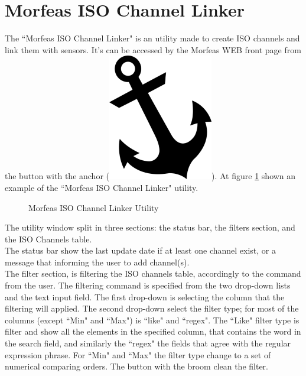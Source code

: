 \newpage
\section{Morfeas ISO Channel Linker}
The ``Morfeas ISO Channel Linker" is an utility made to create ISO channels and link them with sensors.
It's can be accessed by the Morfeas WEB front page from the button with the anchor (\includegraphics[height=.125in]{../art/anchor.png}).
At figure \ref{fig:ISOChannel_linker} shown an example of the ``Morfeas ISO Channel Linker" utility.

\begin{figure}[h]
\centering
	\caption{Morfeas ISO Channel Linker Utility}
	\label{fig:ISOChannel_linker}
\end{figure}
\noindent
The utility window split in three sections: the status bar, the filters section, and the ISO Channels table.\\

The status bar show the last update date if at least one channel exist,
or a message that informing the user to add channel(s).\\

The filter section, is filtering the ISO channels table, accordingly to the command from the user.
The filtering command is specified from the two drop-down lists and the text input field.
The first drop-down is selecting the column that the filtering will applied.
The second drop-down select the filter type; for most of the columns (except ``Min" and ``Max")
is ``like" and ``regex". The ``Like" filter type is filter and show all the elements in the specified column,
that contains the word in the search field, and similarly the ``regex" the fields that agree with the regular expression phrase.
For ``Min" and ``Max" the filter type change to a set of numerical comparing orders.
The button with the broom clean the filter.\\

